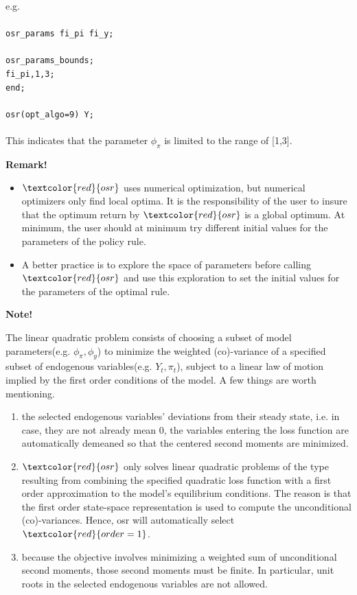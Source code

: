 \documentclass[10pt,math=newtx,citestyle=gb7714-2015,bibstyle=gb7714-2015]{elegantbook}
\begin{document}
{	e.g.\\
	\\
	\texttt{osr\_params fi\_pi fi\_y;\\
		\\
		osr\_params\_bounds;\\
		fi\_pi,1,3;\\
		end;\\
		\\
		osr(opt\_algo=9) Y;}\\
	\\
	
	This indicates that the parameter $\phi_{\pi}$ is limited to the range of [1,3].
	
	\textsf{\textbf{Remark!}}
	\begin{itemize}
		\item $\textcolor{red}{osr}$ uses numerical optimization, but numerical optimizers only find local optima. It is the responsibility of the user to insure that the optimum return by $\textcolor{red}{osr}$ is a global optimum. At minimum, the user should at minimum try different initial values for the parameters of the policy rule.
		\item A better practice is to explore the space of parameters before calling $\textcolor{red}{osr}$ and use this exploration to set the initial values for the parameters of the optimal rule.
	\end{itemize}
	
	\textsf{\textbf{Note!}}
	
	The linear quadratic problem consists of choosing a subset of model parameters(e.g. $\phi_{\pi}, \phi_y$) to minimize the weighted (co)-variance of a specified subset of endogenous variables(e.g. $Y_t, \pi_t$), subject to a linear law of motion implied by the first order conditions of the model. A few things are worth mentioning.
	\begin{enumerate}
		\item the selected endogenous variables’ deviations from their steady state, i.e. in case, they are not already mean 0, the variables entering the loss function are automatically demeaned so that the centered second moments are minimized.
		\item $\textcolor{red}{osr}$ only solves linear quadratic problems of the type resulting from combining the specified quadratic loss function with a first order approximation to the model’s equilibrium conditions. The reason is that the first order state-space representation is used to compute the unconditional (co)-variances. Hence, osr will automatically select $\textcolor{red}{order=1}$.
		\item because the objective involves minimizing a weighted sum of unconditional second moments, those second moments must be finite. In particular, unit roots in the selected endogenous variables are not allowed.
	\end{enumerate}
	
}
\end{document}
